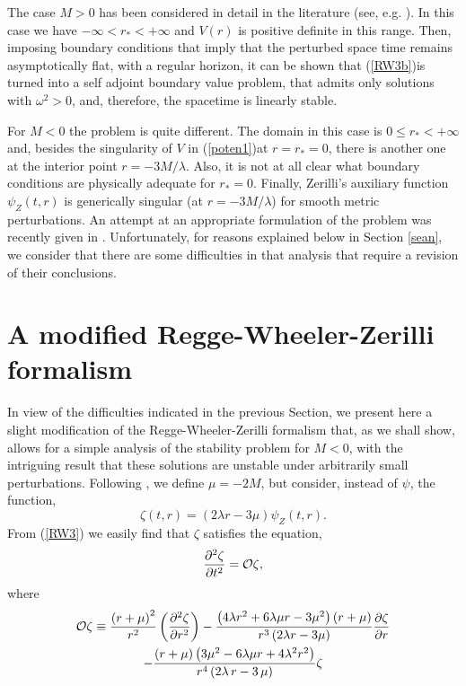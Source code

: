 \documentclass[12pt,aps,floats,showpacs,amssymb,tightenlines]{revtex4}
\begin{document}
The case $M >0$ has been considered in detail in the literature
(see, e.g. \cite{chandra}). In this case we have $-\infty < r_* <
+\infty$ and $V(r)$ is positive definite in this range. Then,
 imposing boundary conditions that imply that the perturbed space time remains asymptotically flat,
  with a regular horizon, it can be shown that (\ref{RW3b})is turned into a self adjoint boundary
  value problem, that admits only solutions with $\omega^2 >0$, and, therefore, the spacetime is
  linearly stable.

For $M<0$ the problem is quite different. The domain in this case is
 $0 \leq r_* < +\infty$ and, besides the singularity of $V$ in (\ref{poten1})at
 $r=r_*=0$, there is another one at the interior point
 $r = -3 M/\lambda$. Also,
 it is not at all clear what boundary conditions are physically adequate
 for $r_*=0$. Finally, Zerilli's auxiliary function $\psi_Z(t,r)$ is generically
 singular (at $r = -3 M/\lambda$) for smooth metric perturbations.
  An attempt at an appropriate formulation of the problem was recently
 given in \cite{ghi}.
  Unfortunately, for reasons explained below in Section \ref{sean}, we consider
 that there are some difficulties in that analysis that require a revision of their conclusions.

\section{A modified Regge-Wheeler-Zerilli formalism}
\label{rwzg}

In view of the difficulties indicated in the previous Section, we
present here a slight modification of the Regge-Wheeler-Zerilli
formalism that, as we shall show, allows for a simple analysis of
 the stability problem for $M<0$, with the intriguing result
 that these solutions are unstable
 under arbitrarily small perturbations.  Following \cite{ghi}, we define
  $\mu = -2M$, but consider,
 instead of $\psi$, the function,
\begin{equation}
\label{AppB1} \zeta(t,r)= (2\lambda r -3 \mu ) \psi_Z(t,r).
\end{equation}
 { } From (\ref{RW3}) we easily find that $\zeta$ satisfies the equation,
 \begin{equation} \label{RW17}
 {\frac {\partial ^{2} \zeta}{\partial {t}^{2}}} = {\cal O}
 \zeta, \end{equation}
 where
 \begin{multline}
 {\cal O} \zeta \equiv
{\frac {   \left( r+\mu \right) ^{2}}{{r}^{2}}}\left( {\frac
{\partial^{2} \zeta}{\partial {r}^{2}}}  \right)   -{\frac {\left(
4\lambda {r}^{2}+ 6 \lambda \mu r-3{\mu}^{2} \right) \left( r+\mu
 \right)  }{{r}^
{3} \left( 2 \lambda r-3\mu \right) }}{\frac {\partial
\zeta}{\partial r}} \\  -{\frac {
 \left( r+\mu \right)  \left( 3{\mu}^{2}- 6 \lambda \mu r+4 \lambda^2 {r}^{2}
 \right) }{{r}^{4} \left( 2 \lambda \,r-3\,\mu \right) }}\zeta
  \nonumber
\end{multline}
\end{document}
